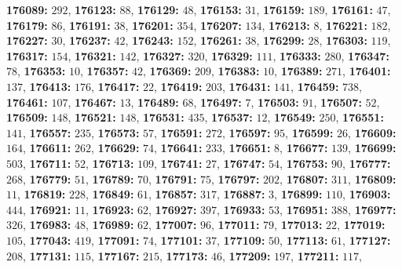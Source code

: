 \textsf{\bfseries 176089:} $292$, \textsf{\bfseries 176123:} $88$, \textsf{\bfseries 176129:} $48$, \textsf{\bfseries 176153:} $31$, \textsf{\bfseries 176159:} $189$, \textsf{\bfseries 176161:} $47$, \textsf{\bfseries 176179:} $86$, \textsf{\bfseries 176191:} $38$, \textsf{\bfseries 176201:} $354$, \textsf{\bfseries 176207:} $134$, \textsf{\bfseries 176213:} $8$, \textsf{\bfseries 176221:} $182$, \textsf{\bfseries 176227:} $30$, \textsf{\bfseries 176237:} $42$, \textsf{\bfseries 176243:} $152$, \textsf{\bfseries 176261:} $38$, \textsf{\bfseries 176299:} $28$, \textsf{\bfseries 176303:} $119$, \textsf{\bfseries 176317:} $154$, \textsf{\bfseries 176321:} $142$, \textsf{\bfseries 176327:} $320$, \textsf{\bfseries 176329:} $111$, \textsf{\bfseries 176333:} $280$, \textsf{\bfseries 176347:} $78$, \textsf{\bfseries 176353:} $10$, \textsf{\bfseries 176357:} $42$, \textsf{\bfseries 176369:} $209$, \textsf{\bfseries 176383:} $10$, \textsf{\bfseries 176389:} $271$, \textsf{\bfseries 176401:} $137$, \textsf{\bfseries 176413:} $176$, \textsf{\bfseries 176417:} $22$, \textsf{\bfseries 176419:} $203$, \textsf{\bfseries 176431:} $141$, \textsf{\bfseries 176459:} $738$, \textsf{\bfseries 176461:} $107$, \textsf{\bfseries 176467:} $13$, \textsf{\bfseries 176489:} $68$, \textsf{\bfseries 176497:} $7$, \textsf{\bfseries 176503:} $91$, \textsf{\bfseries 176507:} $52$, \textsf{\bfseries 176509:} $148$, \textsf{\bfseries 176521:} $148$, \textsf{\bfseries 176531:} $435$, \textsf{\bfseries 176537:} $12$, \textsf{\bfseries 176549:} $250$, \textsf{\bfseries 176551:} $141$, \textsf{\bfseries 176557:} $235$, \textsf{\bfseries 176573:} $57$, \textsf{\bfseries 176591:} $272$, \textsf{\bfseries 176597:} $95$, \textsf{\bfseries 176599:} $26$, \textsf{\bfseries 176609:} $164$, \textsf{\bfseries 176611:} $262$, \textsf{\bfseries 176629:} $74$, \textsf{\bfseries 176641:} $233$, \textsf{\bfseries 176651:} $8$, \textsf{\bfseries 176677:} $139$, \textsf{\bfseries 176699:} $503$, \textsf{\bfseries 176711:} $52$, \textsf{\bfseries 176713:} $109$, \textsf{\bfseries 176741:} $27$, \textsf{\bfseries 176747:} $54$, \textsf{\bfseries 176753:} $90$, \textsf{\bfseries 176777:} $268$, \textsf{\bfseries 176779:} $51$, \textsf{\bfseries 176789:} $70$, \textsf{\bfseries 176791:} $75$, \textsf{\bfseries 176797:} $202$, \textsf{\bfseries 176807:} $311$, \textsf{\bfseries 176809:} $11$, \textsf{\bfseries 176819:} $228$, \textsf{\bfseries 176849:} $61$, \textsf{\bfseries 176857:} $317$, \textsf{\bfseries 176887:} $3$, \textsf{\bfseries 176899:} $110$, \textsf{\bfseries 176903:} $444$, \textsf{\bfseries 176921:} $11$, \textsf{\bfseries 176923:} $62$, \textsf{\bfseries 176927:} $397$, \textsf{\bfseries 176933:} $53$, \textsf{\bfseries 176951:} $388$, \textsf{\bfseries 176977:} $326$, \textsf{\bfseries 176983:} $48$, \textsf{\bfseries 176989:} $62$, \textsf{\bfseries 177007:} $96$, \textsf{\bfseries 177011:} $79$, \textsf{\bfseries 177013:} $22$, \textsf{\bfseries 177019:} $105$, \textsf{\bfseries 177043:} $419$, \textsf{\bfseries 177091:} $74$, \textsf{\bfseries 177101:} $37$, \textsf{\bfseries 177109:} $50$, \textsf{\bfseries 177113:} $61$, \textsf{\bfseries 177127:} $208$, \textsf{\bfseries 177131:} $115$, \textsf{\bfseries 177167:} $215$, \textsf{\bfseries 177173:} $46$, \textsf{\bfseries 177209:} $197$, \textsf{\bfseries 177211:} $117$, 

